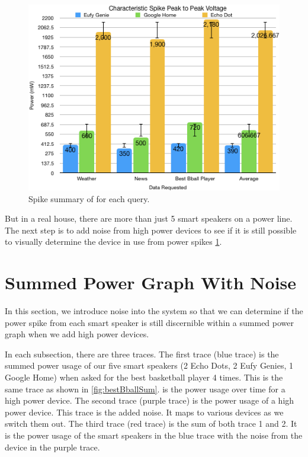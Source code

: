 \begin{figure}[H]
  \centering
  \includegraphics[width=1\textwidth]{figures/spikeVoltages.png}
  \caption{Spike summary of for each query.}
  \label{fig:spikeVoltages}
\end{figure}

But in a real house, there are more than just 5 smart speakers on a power line. The next step is to add noise from high power devices to see if it is still possible to visually determine the device in use from power spikes \ref{sumPowerGraphWithNoise}.

\section{Summed Power Graph With Noise}
\label{sumPowerGraphWithNoise}
In this section, we introduce noise into the system so that we can determine if the power spike from each smart speaker is still discernible within a summed power graph when we add high power devices.

In each subsection, there are three traces. The first trace (blue trace) is the summed power usage of our five smart speakers (2 Echo Dots, 2 Eufy Genies, 1 Google Home) when asked for the best basketball player 4 times. This is the same trace as shown in \ref{fig:bestBballSum}. is the power usage over time for a high power device. The second trace (purple trace) is the power usage of a high power device. This trace is the added noise. It maps to various devices as we switch them out. The third trace (red trace) is the sum of both trace 1 and 2. It is the power usage of the smart speakers in the blue trace with the noise from the device in the purple trace.

